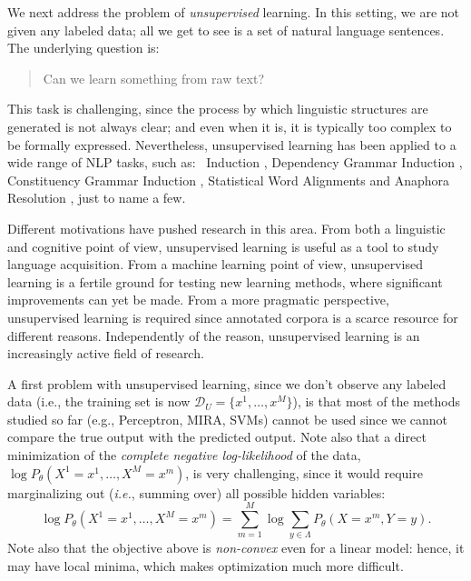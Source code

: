 We next address the problem of \emph{unsupervised} learning. 
In this setting, we are not given any labeled data; all we get to see is a set of natural language sentences.  
The underlying question is: 
\begin{quote}
Can we learn something from raw text?
\end{quote}
This task is challenging, since the process by which linguistic structures are generated is not always clear; 
and even when it is, it is typically too complex to be
formally expressed. Nevertheless, unsupervised learning has been applied to a
wide range of NLP tasks, such as: 
\pos\ Induction  \citep{schutze1995distributional,merialdo1994tet,clark03combining},
Dependency Grammar Induction \citep{klein2004acl,smith2006annealing}, Constituency Grammar Induction \citep{klein2004acl}, Statistical Word Alignments 
\citep{brown94mathematic} and Anaphora Resolution \citep{charniak2009works}, just to name a few. 

Different motivations have pushed research in this area. From both a linguistic and cognitive point of view, 
unsupervised learning is useful as a tool to study language acquisition. 
From a machine learning point of view, unsupervised learning is a fertile ground for testing new learning methods, 
where significant improvements can yet be made. 
From a more pragmatic perspective, unsupervised learning is required
since annotated corpora is a scarce resource for different reasons. Independently of the reason, unsupervised learning is an increasingly active field of research.

A first problem with unsupervised learning, since we don't observe any labeled data (i.e., 
the training set is now $\mathcal{D}_{U} = \{x^1,\ldots, x^M\}$), 
is that most of the methods studied so far (e.g., Perceptron, MIRA, SVMs) cannot be used since we cannot compare 
the true output with the predicted output. 
Note also that a direct minimization of the \emph{complete negative log-likelihood} of the data, $\log P_{\theta}(X^1=x^1,\ldots,X^M=x^m)$, 
is very challenging, since it would require marginalizing out (\emph{i.e.}, summing over) all possible hidden variables:
\begin{equation}
 \log P_{\theta}(X^1=x^1,\ldots,X^M=x^m) =  \sum_{m=1}^M \log \sum_{y \in \Lambda} P_{\theta} (X=x^m,Y=y).
\end{equation}
Note also that the objective above is \emph{non-convex} even for a linear model: hence, it may have local minima, which makes optimization much 
more difficult.%

